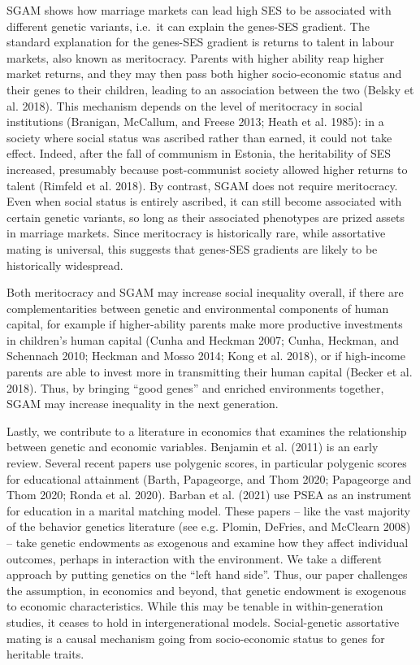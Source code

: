 \documentclass[
]{article}
\theoremstyle{definition}
\theoremstyle{definition}
\theoremstyle{definition}
\theoremstyle{definition}
\theoremstyle{remark}
\begin{document}
SGAM shows how marriage markets can lead high SES to be associated with
different genetic variants, i.e.~it can explain the genes-SES gradient. The
standard explanation for the genes-SES gradient is returns to talent in labour
markets, also known as meritocracy. Parents with higher ability reap higher
market returns, and they may then pass both higher socio-economic status and
their genes to their children, leading to an association between the two
(Belsky et al. 2018). This mechanism depends on the level of meritocracy in
social institutions (Branigan, McCallum, and Freese 2013; Heath et al. 1985): in a society where
social status was ascribed rather than earned, it could not take effect. Indeed,
after the fall of communism in Estonia, the heritability of SES increased,
presumably because post-communist society allowed higher returns to talent
(Rimfeld et al. 2018). By contrast, SGAM does not require meritocracy. Even when
social status is entirely ascribed, it can still become associated with certain
genetic variants, so long as their associated phenotypes are prized assets in
marriage markets. Since meritocracy is historically rare, while assortative
mating is universal, this suggests that genes-SES gradients are likely to be
historically widespread.

Both meritocracy and SGAM may increase social inequality overall, if there are
complementarities between genetic and environmental components of human capital,
for example if higher-ability parents make more productive investments in
children's human capital (Cunha and Heckman 2007; Cunha, Heckman, and Schennach 2010; Heckman and Mosso 2014; Kong et al. 2018), or if high-income parents are able to
invest more in transmitting their human capital (Becker et al. 2018). Thus, by
bringing ``good genes'' and enriched environments together, SGAM may increase
inequality in the next generation.

Lastly, we contribute to a literature in economics that examines the
relationship between genetic and economic variables. Benjamin et al. (2011) is an
early review. Several recent papers use polygenic scores, in particular
polygenic scores for educational attainment (Barth, Papageorge, and Thom 2020; Papageorge and Thom 2020; Ronda et al. 2020). Barban et al. (2021) use PSEA as an
instrument for education in a marital matching model. These papers --
like the vast majority of the behavior genetics literature (see e.g. Plomin, DeFries, and McClearn 2008) -- take genetic endowments as exogenous and examine how
they affect individual outcomes, perhaps in interaction with the environment. We
take a different approach by putting genetics on the ``left hand side''. Thus, our
paper challenges the assumption, in economics and beyond, that genetic endowment
is exogenous to economic characteristics. While this may be tenable in
within-generation studies, it ceases to hold in intergenerational models.
Social-genetic assortative mating is a causal mechanism going from
socio-economic status to genes for heritable traits.
\end{document}
